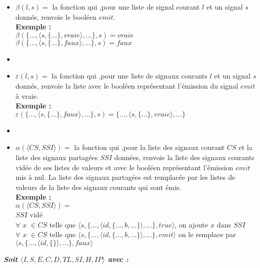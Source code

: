 \documentclass[10pt,a4paper]{report}
\begin{document}
\begin{itemize}
\item[] $\beta(l,s) =$ la fonction qui ,pour une liste de signal courant $l$ et un signal $s$ donnés, renvoie le booléen $emit$.
  \\\textbf{Exemple :}
  \\ $\beta(\{...,\langle s,\{...\},vraie\rangle,...\},s) = vraie$\\
  $\beta(\{...,\langle s,\{...\},faux\rangle,...\},s) = faux$
\item[] 
\item[] $\varepsilon(l,s) =$ la fonction qui ,pour une liste de signaux courants $l$ et un signal $s$ donnés, renvoie la liste avec le booléen représentant l'émission du signal $emit$ à vraie.
  \\\textbf{Exemple :}
  \\ $\varepsilon(\{...,\langle s,\{...\},faux\rangle,...\},s) = \{...,\langle s,\{...\},vraie\rangle,...\}$
\item[] 
  
\item[] $\alpha(\langle CS,SSI\rangle) =$ la fonction qui ,pour la liste des signaux courant $CS$ et la liste des signaux partagées $SSI$ données, renvoie la liste des signaux courants vidée de ses listes de valeurs et avec le booléen représentant l'émission $emit$ mis à nul. La liste des signaux partagées est remplacée par les listes de valeurs de la liste des signaux courants qui sont émis.
  \\\textbf{Exemple :}
  \\ $\alpha(\langle CS,SSI\rangle) =$
  \\ $SSI$ vidé
  \\ $\forall$ $x$ $\in CS$ telle que $\langle s,\{...,\langle id,\{...,b,...\}\rangle,...\},true\rangle$, on ajoute $x$ dans $SSI$
  \\ $\forall$ $x$ $\in CS$ telle que $\langle s,\{...,\langle id,\{...,b,...\}\rangle,...\},emit\rangle$ on le remplace par $\langle s,\{...,\langle id,\{\}\rangle,...\},faux\rangle$  
\end{itemize}
\newpage



\textbf{\textit{Soit $\langle I,S,E,C,D,TL,SI,H,IP\rangle$ avec :}}
\end{document}
